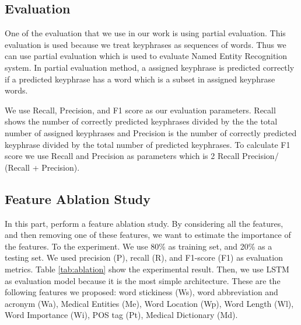 \subsection{Evaluation}
One of the evaluation that we use in our work is using partial evaluation. This evaluation is used because we treat keyphrases as sequences of words. Thus we can use partial evaluation which is used to evaluate Named Entity Recognition system. In partial evaluation method, a assigned keyphrase is predicted correctly if a predicted keyphrase has a word which is a subset in assigned keyphrase words. 

We use Recall, Precision, and F1 score as our evaluation parameters. Recall shows the number of correctly predicted keyphrases divided by the the total number of assigned keyphrases and Precision is the number of correctly predicted keyphrase divided by the total number of predicted keyphrases. To calculate F1 score we use Recall and Precision as parameters which is 2  Recall  Precision/ (Recall + Precision).
\subsection{Feature Ablation Study}
In this part, perform a feature ablation study. By considering all the features, and then removing one of these features, we want to estimate the importance of the features. To the experiment. We use 80\% as training set, and 20\% as a testing set. We used precision (P), recall (R), and F1-score (F1) as evaluation metrics. Table \ref{tab:ablation} show the experimental result. Then, we use LSTM as evaluation model because it is the most simple architecture. These are the following features we proposed: word stickiness (Ws), word abbreviation and acronym (Wa), Medical Entities (Me), Word Location (Wp), Word Length (Wl), Word Importance (Wi), POS tag (Pt), Medical Dictionary (Md).

